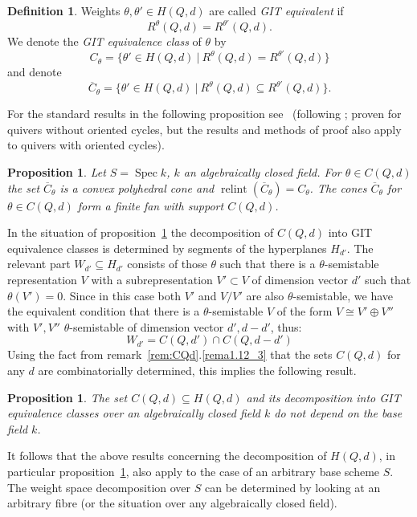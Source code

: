 \documentclass[10pt,a4paper]{amsart}
\newtheorem{prop}[theo]{Proposition}
\theoremstyle{definition}
\newtheorem{defi}[theo]{Definition}
\DeclareMathOperator{\Spec}{Spec}
\DeclareMathOperator{\relint}{relint}
\begin{document}
\begin{defi}
Weights $\theta,\theta'\in H(Q,d)$ are called {\it GIT equivalent} if 
\[R^\theta(Q,d)=R^{\theta'}(Q,d).\]
We denote the {\it GIT equivalence class} of $\theta$ by 
\[C_\theta=\{\theta'\in H(Q,d)\:|\:R^\theta(Q,d)=R^{\theta'}(Q,d)\}\]
and denote
\[\overline{C}_\theta=\{\theta'\in H(Q,d)\:|\:R^\theta(Q,d)\subseteq R^{\theta'}(Q,d)\}.\]
\end{defi}


For the standard results in the following proposition see~\cite{Ch08} (following
\cite{Re00}; proven for quivers without oriented cycles, but the results and 
methods of proof also apply to quivers with oriented cycles).

\begin{prop}\label{prop:GITclasses}
Let $S=\Spec k$, $k$ an algebraically closed field.
For $\theta\in C(Q,d)$ the set $\overline{C}_\theta$ is a convex polyhedral
cone and $\relint(\overline{C}_\theta)=C_\theta$. 
The cones $\overline{C}_\theta$ for $\theta\in C(Q,d)$ form a finite 
fan with support $C(Q,d)$.
\end{prop}

In the situation of proposition~\ref{prop:GITclasses} the decomposition of $C(Q,d)$ 
into GIT equivalence classes is determined by segments of the hyperplanes $H_{d'}$. 
The relevant part $W_{d'}\subseteq H_{d'}$ consists of those $\theta$ such that 
there is a $\theta$-semistable representation $V$ with a subrepresentation 
$V'\subset V$ of dimension vector $d'$ such that $\theta(V')=0$. Since in this case 
both $V'$ and $V/V'$ are also $\theta$-semistable, we have the equivalent condition 
that there is a $\theta$-semistable $V$ of the form $V\cong V'\oplus V''$ with 
$V',V''$ $\theta$-semistable of dimension vector $d',d-d'$, 
thus:
\[
W_{d'}=C(Q,d')\cap C(Q,d-d')
\]
Using the fact from remark~\ref{rem:CQd}.\ref{rema1.12_3} that the sets $C(Q,d)$ for any $d$ are 
combinatorially determined, this implies the following result.

\begin{prop}
The set $C(Q,d)\subseteq H(Q,d)$ and its decomposition into GIT equivalence classes 
over an algebraically closed field $k$ do not depend on the base field $k$.
\end{prop}

It follows that the above results concerning the decomposition of $H(Q,d)$, in particular 
proposition~\ref{prop:GITclasses}, also apply to the case of an arbitrary base scheme $S$. 
The weight space decomposition over $S$ can be determined by looking at an arbitrary fibre 
(or the situation over any algebraically closed field).
\end{document}
